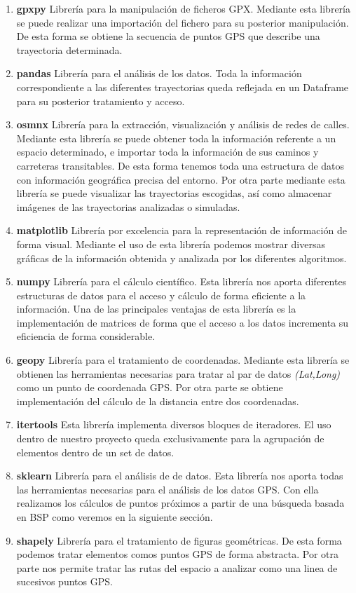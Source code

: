 \begin{enumerate}[label={L.\arabic*.}]
\item \textbf{gpxpy} Librería para la manipulación de ficheros \ac{GPX}. Mediante esta 
librería se puede realizar una importación del fichero para su posterior manipulación. 
De esta forma se obtiene la secuencia de puntos \ac{GPS} que describe una trayectoria 
determinada.
\item \textbf{pandas} Librería para el análisis de los datos. Toda la información 
correspondiente a las diferentes trayectorias queda reflejada en un Dataframe para su 
posterior tratamiento y acceso.
\item \textbf{osmnx} Librería para la extracción, visualización y análisis de redes de 
calles. Mediante esta librería se puede obtener toda la información referente a un 
espacio determinado, e importar toda la información de sus caminos y carreteras 
transitables. De esta forma tenemos toda una estructura de datos con información 
geográfica precisa del entorno. Por otra parte mediante esta librería se puede visualizar 
las trayectorias escogidas, así como almacenar imágenes de las trayectorias analizadas 
o simuladas.
\item \textbf{matplotlib} Librería por excelencia para la representación de información 
de forma visual. Mediante el uso de esta librería podemos mostrar diversas gráficas de 
la información obtenida y analizada por los diferentes algoritmos.
\item \textbf{numpy} Librería para el cálculo científico. Esta librería nos aporta 
diferentes estructuras de datos para el acceso y cálculo de forma eficiente a la 
información. Una de las principales ventajas de esta librería es la implementación de 
matrices de forma que el acceso a los datos incrementa su eficiencia de forma 
considerable.
\item \textbf{geopy} Librería para el tratamiento de coordenadas. Mediante esta librería 
se obtienen las herramientas necesarias para tratar al par de datos \textit{(Lat,Long)} 
como un punto de coordenada  \ac{GPS}. Por otra parte se obtiene implementación del 
cálculo de la distancia entre dos coordenadas.
\item \textbf{itertools} Esta librería implementa diversos bloques de iteradores. El uso 
dentro de nuestro proyecto queda exclusivamente para la agrupación de elementos 
dentro de un set de datos.
\item \textbf{sklearn} Librería para el análisis de de datos. Esta librería nos aporta todas 
las herramientas necesarias para el análisis de los datos \ac{GPS}. Con ella realizamos 
los cálculos de puntos próximos a partir de una búsqueda basada en \ac{BSP} como 
veremos en la siguiente sección.
\item \textbf{shapely} Librería para el tratamiento de figuras geométricas. De esta 
forma podemos tratar elementos comos puntos \ac{GPS} de forma abstracta. Por otra 
parte nos permite tratar las rutas del espacio a analizar como una linea de sucesivos 
puntos \ac{GPS}.
\end{enumerate}

